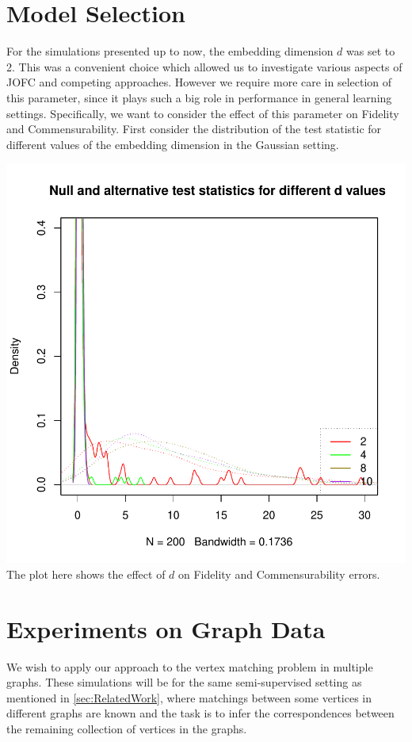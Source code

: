 \documentclass[11pt]{article} %
\begin{document}
\section{Model Selection}
For the simulations presented up to now, the embedding dimension $d$  was set to 2. This was a convenient choice which allowed us to investigate various aspects of JOFC and competing approaches.
However we require more care in selection of this parameter, since it plays such a big role in performance in general learning settings. Specifically, we want to consider the effect of this parameter on Fidelity and Commensurability.
First consider the distribution of the test statistic for different values of the embedding dimension in the Gaussian setting.


\includegraphics{FidCommPaper-fig-stats-d}
The plot here shows the effect of $d$ on Fidelity and Commensurability errors.
 


\section{Experiments on Graph Data}

We wish to apply our approach to  the vertex matching problem in multiple graphs. These simulations will be for the same semi-supervised setting as mentioned in \ref{sec:RelatedWork}, where matchings between some vertices in different graphs are known 
  and the task is to infer the correspondences between the remaining collection of vertices in the graphs.
\end{document}
